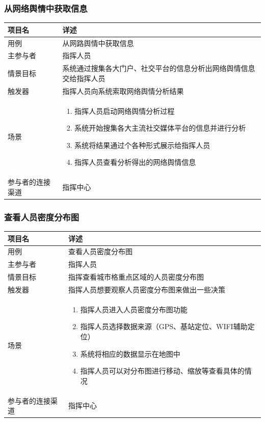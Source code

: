 \documentclass{ctexrep}
\begin{document}
\subsubsection{从网络舆情中获取信息}
\begin{longtable}{p{2cm} | p{10cm}}
\hline
项目名 & 详述 \\
\hline
\hline
用例 & 从网路舆情中获取信息\\
\hline
主参与者 & 指挥人员 \\
\hline
情景目标 &  系统通过搜集各大门户、社交平台的信息分析出网络舆情信息交给指挥人员\\
\hline
触发器 &  指挥人员向系统索取网络舆情分析结果\\
\hline
场景 & \begin{enumerate}
	\item 指挥人员启动网络舆情分析过程
	\item 系统开始搜集各大主流社交媒体平台的信息并进行分析
	\item 系统将结果通过个各种形式展示给指挥人员
	\item 指挥人员查看分析得出的网络舆情信息
\end{enumerate} \\
\hline
参与者的连接渠道 & 指挥中心 \\
\hline
\end{longtable}

\subsubsection{查看人员密度分布图}
\begin{longtable}{p{2cm} | p{10cm}}
\hline
项目名 & 详述 \\
\hline
\hline
用例 & 查看人员密度分布图\\
\hline
主参与者 & 指挥人员 \\
\hline
情景目标 &  指挥查看城市格重点区域的人员密度分布图\\
\hline
触发器 &  指挥人员想要观察人员密度分布图来做出一些决策\\
\hline
场景 & \begin{enumerate}
	\item 指挥人员进入人员密度分布图功能
	\item 指挥人员选择数据来源（GPS、基站定位、WIFI辅助定位）
	\item 系统将相应的数据显示在地图中
	\item 指挥人员可以对分布图进行移动、缩放等查看具体的情况
\end{enumerate} \\
\hline
参与者的连接渠道 & 指挥中心 \\
\hline
\end{longtable}
\end{document}
